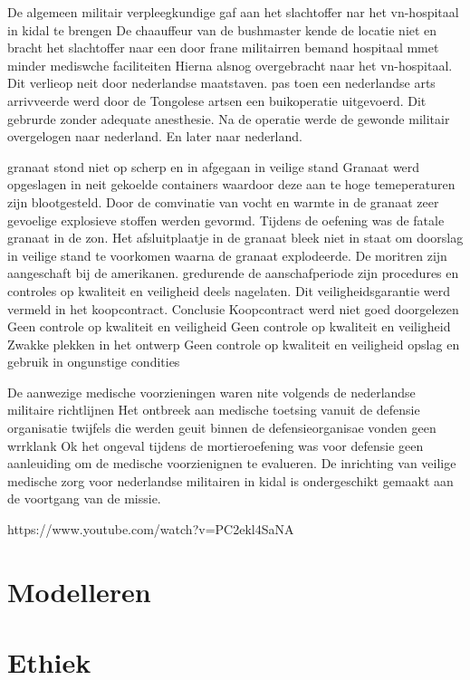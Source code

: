 De algemeen militair verpleegkundige gaf aan het slachtoffer nar het vn-hospitaal in kidal te brengen
De chaauffeur van de bushmaster kende de locatie niet  en bracht het slachtoffer naar een door frane militairren bemand hospitaal mmet minder mediswche faciliteiten
Hierna alsnog overgebracht naar het vn-hospitaal.
Dit verlieop  neit door nederlandse maatstaven.
pas toen een nederlandse arts arrivveerde werd door de Tongolese artsen een buikoperatie uitgevoerd.
Dit gebrurde zonder adequate anesthesie.
Na de operatie werde de gewonde militair overgelogen naar nederland. En later naar nederland.


granaat stond niet op scherp en in afgegaan in veilige stand
Granaat werd opgeslagen in neit gekoelde containers waardoor deze aan te hoge temeperaturen zijn blootgesteld.
Door de comvinatie van vocht en warmte in de granaat zeer gevoelige explosieve stoffen werden gevormd.
Tijdens de oefening was de fatale granaat in de zon.
Het afsluitplaatje in de granaat bleek niet in staat om doorslag in veilige stand te voorkomen waarna de granaat explodeerde.
De moritren zijn aangeschaft bij de amerikanen. gredurende de aanschafperiode zijn procedures en controles op kwaliteit en veiligheid deels nagelaten.
Dit veiligheidsgarantie werd vermeld in het koopcontract.
Conclusie
Koopcontract werd niet goed doorgelezen
Geen controle op kwaliteit en veiligheid
Geen controle op kwaliteit en veiligheid
Zwakke plekken in het ontwerp
Geen controle op kwaliteit en veiligheid
opslag en gebruik in ongunstige condities

De aanwezige medische voorzieningen waren nite volgends de nederlandse militaire richtlijnen
Het ontbreek aan medische toetsing vanuit de defensie organisatie
twijfels die werden geuit binnen de defensieorganisae vonden geen wrrklank
Ok het ongeval tijdens de mortieroefening was voor defensie geen aanleuiding om de medische voorzienignen te evalueren.
De inrichting van veilige medische zorg voor nederlandse militairen in kidal is ondergeschikt gemaakt aan de voortgang van de missie.


https://www.youtube.com/watch?v=PC2ekl4SaNA 

\section{Modelleren}


\section{Ethiek}


